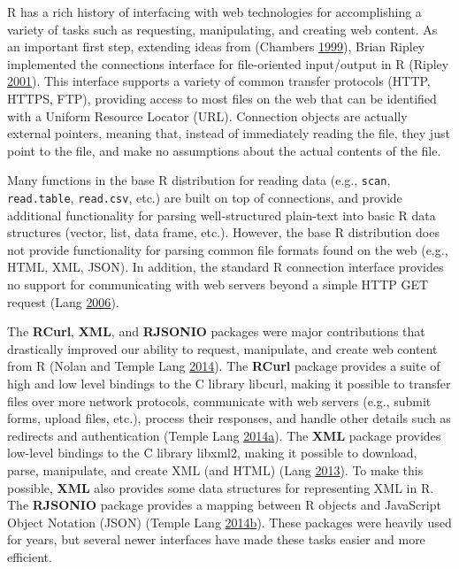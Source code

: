 \documentclass[12pt,]{isuthesis}
\begin{document}
R has a rich history of interfacing with web technologies for
accomplishing a variety of tasks such as requesting, manipulating, and
creating web content. As an important first step, extending ideas from
(Chambers \protect\hyperlink{ref-Chambers:1999}{1999}), Brian Ripley
implemented the connections interface for file-oriented input/output in
R (Ripley \protect\hyperlink{ref-Connections}{2001}). This interface
supports a variety of common transfer protocols (HTTP, HTTPS, FTP),
providing access to most files on the web that can be identified with a
Uniform Resource Locator (URL). Connection objects are actually external
pointers, meaning that, instead of immediately reading the file, they
just point to the file, and make no assumptions about the actual
contents of the file.

Many functions in the base R distribution for reading data (e.g.,
\texttt{scan}, \texttt{read.table}, \texttt{read.csv}, etc.) are built
on top of connections, and provide additional functionality for parsing
well-structured plain-text into basic R data structures (vector, list,
data frame, etc.). However, the base R distribution does not provide
functionality for parsing common file formats found on the web (e.g.,
HTML, XML, JSON). In addition, the standard R connection interface
provides no support for communicating with web servers beyond a simple
HTTP GET request (Lang \protect\hyperlink{ref-Lang:2006us}{2006}).

The \textbf{RCurl}, \textbf{XML}, and \textbf{RJSONIO} packages were
major contributions that drastically improved our ability to request,
manipulate, and create web content from R (Nolan and Temple Lang
\protect\hyperlink{ref-nolan-lang}{2014}). The \textbf{RCurl} package
provides a suite of high and low level bindings to the C library
libcurl, making it possible to transfer files over more network
protocols, communicate with web servers (e.g., submit forms, upload
files, etc.), process their responses, and handle other details such as
redirects and authentication (Temple Lang
\protect\hyperlink{ref-RCurl}{2014}\protect\hyperlink{ref-RCurl}{a}).
The \textbf{XML} package provides low-level bindings to the C library
libxml2, making it possible to download, parse, manipulate, and create
XML (and HTML) (Lang \protect\hyperlink{ref-XML}{2013}). To make this
possible, \textbf{XML} also provides some data structures for
representing XML in R. The \textbf{RJSONIO} package provides a mapping
between R objects and JavaScript Object Notation (JSON) (Temple Lang
\protect\hyperlink{ref-RJSONIO}{2014}\protect\hyperlink{ref-RJSONIO}{b}).
These packages were heavily used for years, but several newer interfaces
have made these tasks easier and more efficient.
\end{document}
